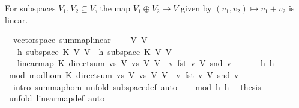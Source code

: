\begin{isabellebody}
\isamarkupfalse%
%
\endisatagproof
{\isafoldproof}%
%
\isadelimproof
%
\endisadelimproof
%
\begin{isamarkuptext}%
For subspaces $V_1,V_2\subseteq V$, the map $V_1\oplus V_2\to V$ given by $(v_1,v_2)\mapsto 
v_1+v_2$ is linear.%
\end{isamarkuptext}%
\isamarkuptrue%
\isamarkupfalse%
\ {\isacharparenleft}\ vectorspace{\isacharparenright}\ sum{\isacharunderscore}map{\isacharunderscore}linear{\isacharcolon}\ \isanewline
\ \ \ V{}\ V{}\isanewline
\ \ \ h{}{\isacharcolon}\ {\isachardoublequoteopen}subspace\ K\ V{}\ V{\isachardoublequoteclose}\ \ h{}{\isacharcolon}\ {\isachardoublequoteopen}subspace\ K\ V{}\ V{\isachardoublequoteclose}\isanewline
\ \ \ {\isachardoublequoteopen}linear{\isacharunderscore}map\ K\ {\isacharparenleft}direct{\isacharunderscore}sum\ {\isacharparenleft}vs\ V{}{\isacharparenright}\ {\isacharparenleft}vs\ V{}{\isacharparenright}{\isacharparenright}\ V\ {\isacharparenleft}{\isasymlambda}\ v{\isachardot}\ {\isacharparenleft}fst\ v{\isacharparenright}\ {\isasymoplus}\isactrlbsub V\isactrlesub \ {\isacharparenleft}snd\ v{\isacharparenright}{\isacharparenright}{\isachardoublequoteclose}\isanewline
%
\isadelimproof
%
\endisadelimproof
%
\isatagproof
{}\isamarkupfalse%
\ {\isacharminus}\ \isanewline
\ \ \isamarkupfalse%
\ h{}\ h{}\ \isamarkupfalse%
\ mod{\isacharcolon}\ {\isachardoublequoteopen}mod{\isacharunderscore}hom\ K\ {\isacharparenleft}direct{\isacharunderscore}sum\ {\isacharparenleft}vs\ V{}{\isacharparenright}\ {\isacharparenleft}vs\ V{}{\isacharparenright}{\isacharparenright}\ V\ {\isacharparenleft}{\isasymlambda}\ v{\isachardot}\ {\isacharparenleft}fst\ v{\isacharparenright}\ {\isasymoplus}\isactrlbsub V\isactrlesub \ {\isacharparenleft}snd\ v{\isacharparenright}{\isacharparenright}{\isachardoublequoteclose}\ \isanewline
\ \ \ \ \isamarkupfalse%
\ {\isacharparenleft}\ intro\ sum{\isacharunderscore}map{\isacharunderscore}hom{\isacharcomma}\ unfold\ subspace{\isacharunderscore}def{\isacharcomma}\ auto{\isacharparenright}\isanewline
\ \ \isamarkupfalse%
\ mod\ h{}\ h{}\ \isamarkupfalse%
\ {\isacharquery}thesis\ \isanewline
\ \ \ \ \isamarkupfalse%
\ {\isacharparenleft}unfold\ linear{\isacharunderscore}map{\isacharunderscore}def{\isacharcomma}\ auto{\isacharparenright}\ \isamarkupfalse%

\end{isabellebody}
